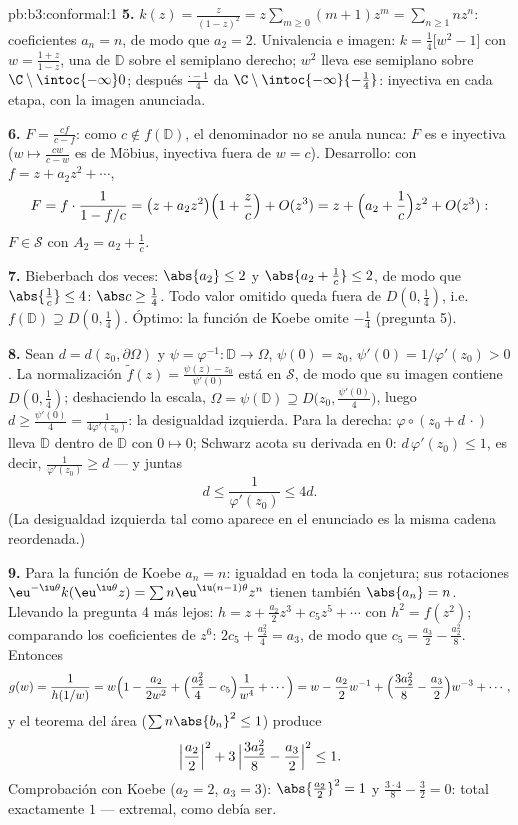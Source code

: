 \begin{solution}{pb:b3:conformal:1}
\textbf{5.} $k(z) = \frac z{(1-z)^2} = z\sum_{m\geq0}(m +
1)z^m = \sum_{n\geq1}nz^n$: coeficientes $a_n = n$, de modo que $a_2 =
2$. Univalencia e imagen: $k = \frac14\bigl[w^2 - 1\bigr]$ con
$w = \frac{1 + z}{1 - z}$, una
 de $\mathbb D$
sobre el semiplano derecho; $w^2$ lleva ese semiplano
 sobre
$\C\setminus\intoc{-\infty}0$; después $\frac{\cdot - 1}4$ da
$\C\setminus\intoc{-\infty}{-\frac14}$: inyectiva en cada etapa, con la
imagen anunciada.

\textbf{6.} $F = \frac{cf}{c - f}$: como $c \notin f(\mathbb
D)$, el denominador no se anula nunca: $F$ es
 e inyectiva
($w \mapsto \frac{cw}{c - w}$ es de Möbius, inyectiva fuera de $w = c$).
Desarrollo: con $f = z + a_2z^2 + \cdots$,
\[
F = f\cdot\frac1{1 - f/c} = \bigl(z + a_2z^2\bigr)\Bigl(1 +
\frac zc\Bigr) + O(z^3)
= z + \Bigl(a_2 + \frac1c\Bigr)z^2 + O(z^3):
\]
$F \in \mathcal S$ con $A_2 = a_2 + \frac1c$.

\textbf{7.} Bieberbach dos veces: $\abs{a_2} \leq 2$ y
$\abs{a_2 + \frac1c} \leq 2$, de modo que $\abs{\frac1c} \leq 4$:
$\abs c \geq \frac14$. Todo valor omitido queda fuera de
$D(0,\frac14)$, i.e.\ $f(\mathbb D) \supseteq D(0, \frac14)$.
Óptimo: la función de Koebe omite $-\frac14$ (pregunta 5).

\textbf{8.} Sean $d = d(z_0, \partial\Omega)$ y $\psi =
\varphi^{-1} \colon \mathbb D \to \Omega$, $\psi(0) = z_0$,
$\psi'(0) = 1/\varphi'(z_0) > 0$. La normalización $\tilde
f(z) = \frac{\psi(z) - z_0}{\psi'(0)}$ está en $\mathcal S$, de modo que
su imagen contiene $D(0, \frac14)$; deshaciendo la escala,
$\Omega = \psi(\mathbb D) \supseteq D\bigl(z_0,
\tfrac{\psi'(0)}4\bigr)$, luego $d \geq \frac{\psi'(0)}4 =
\frac1{4\varphi'(z_0)}$: la desigualdad izquierda. Para la derecha:
$\varphi\circ(z_0 + d\,\cdot)$ lleva $\mathbb D$ dentro de $\mathbb D$
con $0 \mapsto 0$; Schwarz acota su derivada en $0$:
$d\,\varphi'(z_0) \leq 1$, es decir, $\frac1{\varphi'(z_0)} \geq d$ ---
y juntas
\[
d \leq \frac1{\varphi'(z_0)} \leq 4d .
\]
(La desigualdad izquierda tal como aparece en el enunciado es la misma
cadena reordenada.)

\textbf{9.} Para la función de Koebe $a_n = n$: igualdad en toda la
conjetura; sus rotaciones $\eu^{-\iu\theta}k(\eu^{\iu\theta}z) = \sum
n\eu^{\iu(n-1)\theta}z^n$ tienen también $\abs{a_n} = n$. Llevando la
pregunta 4 más lejos: $h = z + \frac{a_2}2z^3 + c_5z^5 + \cdots$ con
$h^2 = f(z^2)$; comparando los coeficientes de $z^6$: $2c_5 +
\frac{a_2^2}4 = a_3$, de modo que $c_5 = \frac{a_3}2 -
\frac{a_2^2}8$. Entonces
\[
g(w) = \frac1{h(1/w)} = w\Bigl(1 - \frac{a_2}{2w^2} +
\Bigl(\frac{a_2^2}4 - c_5\Bigr)\frac1{w^4} + \cdots\Bigr)
= w - \frac{a_2}2w^{-1} + \Bigl(\frac{3a_2^2}8 -
\frac{a_3}2\Bigr)w^{-3} + \cdots,
\]
y el teorema del área ($\sum n\abs{b_n}^2 \leq 1$) produce
\[
\Bigl|\frac{a_2}2\Bigr|^2 + 3\,\Bigl|\frac{3a_2^2}8 -
\frac{a_3}2\Bigr|^2 \leq 1 .
\]
Comprobación con Koebe ($a_2 = 2$, $a_3 = 3$): $\abs{\frac{a_2}2}^2 = 1$
y $\frac{3\cdot4}8 - \frac32 = 0$: total exactamente $1$ --- extremal,
como debía ser.


\end{solution}
